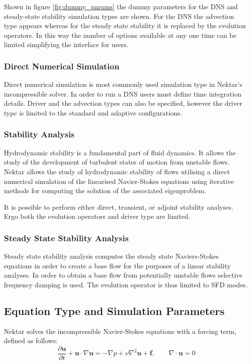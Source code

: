 \documentclass[11pt, a4paper]{report}
\begin{document}
Shown in figure \ref{fig:dummy_params} the dummy parameters for the DNS and steady-state stability simulation types are shown. For the DNS the advection type appears whereas for the steady state stability it is replaced by the evolution operators. In this way the number of options available at any one time can be limited simplifying the interface for users.

\subsubsection{Direct Numerical Simulation}
Direct numerical simulation is most commonly used simulation type in Nektar's incompressible solver. In order to run a DNS users must define time integration details. Driver and the advection types can also be specified, however the driver type is limited to the standard and adaptive configurations.

\subsubsection{Stability Analysis}
Hydrodynamic stability is a fundamental part of fluid dynamics. It allows the study of the development of turbulent states of motion from unstable flows. Nektar allows the study of  hydrodynamic stability of flows utilising a direct numerical simulation of the linearised Navier-Stokes equations using iterative methods for computing the solution of the associated eigenproblem.

It is possible to perform either direct, transient, or adjoint stability analyses. Ergo both the evolution operators and driver type are limited.

\subsubsection{Steady State Stability Analysis}
Steady state stability analysis computes the steady state Naviers-Stokes equations in order to create a base flow for the purposes of a linear stability analyses. In order to obtain a base flow from potentially unstable flows selective frequency damping is used. The evolution operator is thus limited to SFD modes.

\subsection{Equation Type and Simulation Parameters}
Nektar solves the incompressible Navier-Stokes equations with a forcing term, defined as follows:
\begin{equation}
\frac{\partial \mathbf{u}}{\partial t} + \mathbf{u} \cdot \nabla \mathbf{u} = - \nabla p + \nu \nabla^{2} \mathbf{u} + \mathbf{f}, \qquad \nabla \cdot \mathbf{u} = 0
\label{eq:IncNS}
\end{equation}
\end{document}
